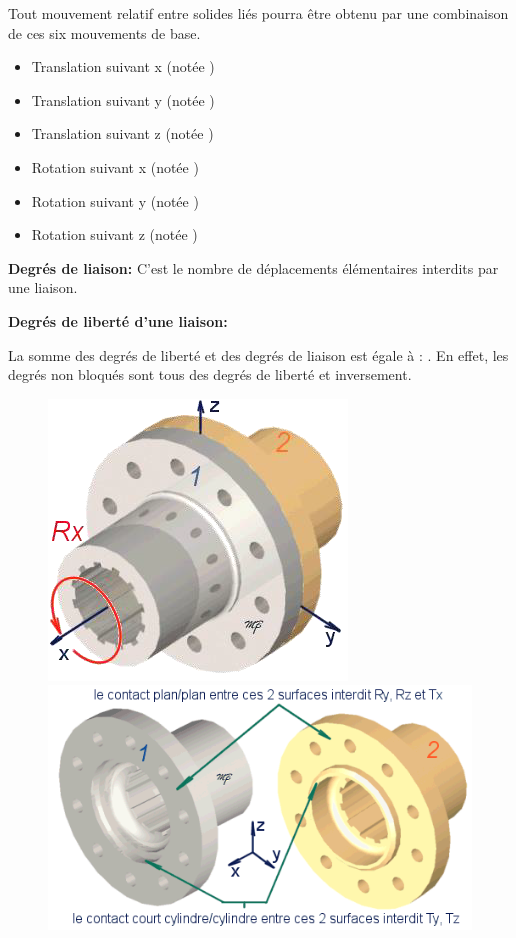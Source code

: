 \documentclass[10pt,fleqn]{article} %
\begin{document}
Tout mouvement  relatif  entre  solides  liés  pourra  être  obtenu  par  une  combinaison de  ces  six  mouvements  de base.

\begin{itemize}
    \item Translation suivant x (notée )
    \item Translation suivant y (notée )
    \item Translation suivant z (notée )
    \item Rotation suivant x (notée )
    \item Rotation suivant y (notée )
    \item Rotation suivant z (notée )
\end{itemize}


\begin{defi}
\textbf{Degrés de liaison:}
C'est le nombre de déplacements élémentaires interdits par
une liaison.

 \textbf{ Degrés  de  liberté  d'une  liaison:}


La somme des degrés de liberté et des degrés de liaison est égale à : .
En effet, les degrés non bloqués sont tous des degrés de liberté et inversement.
\end{defi}
\pagebreak
\begin{figure}[h]
  \includegraphics[width=.33\textwidth]{images/fig1} \includegraphics[width=.6\textwidth]{images/fig2}
  \caption{}
  \label{fig:plan}
\end{figure}
\end{document}
